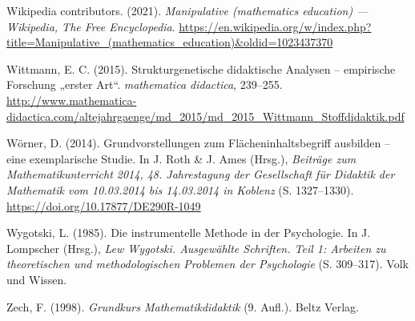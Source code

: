 \documentclass[
]{scrbook}
\newlength{\cslhangindent}
\newlength{\cslentryspacingunit} %
\newenvironment{CSLReferences}[2] %
 {%
  \setlength{\parindent}{0pt}
  \ifodd #1
  \let\oldpar\par
  \def\par{\hangindent=\cslhangindent\oldpar}
  \fi
  \setlength{\parskip}{#2\cslentryspacingunit}
 }%
 {}
\theoremstyle{definition}
\theoremstyle{definition}
\theoremstyle{definition}
\theoremstyle{definition}
\theoremstyle{remark}
\begin{document}
\begin{CSLReferences}{1}{0}
\leavevmode{}%
Wikipedia contributors. (2021). \emph{Manipulative (mathematics education) --- {Wikipedia}{,} The Free Encyclopedia}. \url{https://en.wikipedia.org/w/index.php?title=Manipulative_(mathematics_education)\&oldid=1023437370}

\leavevmode{}%
Wittmann, E. C. (2015). Strukturgenetische didaktische {Analysen} -- empirische {Forschung} „erster {Art}``. \emph{mathematica didactica}, 239--255. \url{http://www.mathematica-didactica.com/altejahrgaenge/md_2015/md_2015_Wittmann_Stoffdidaktik.pdf}

\leavevmode{}%
Wörner, D. (2014). Grundvorstellungen zum {Flächeninhaltsbegriff} ausbilden -- eine exemplarische {Studie}. In J. Roth \& J. Ames (Hrsg.), \emph{Beiträge zum {Mathematikunterricht} 2014, 48. {Jahrestagung} der {Gesellschaft} für {Didaktik} der {Mathematik} vom 10.03.2014 bis 14.03.2014 in {Koblenz}} (S. 1327--1330). \url{https://doi.org/10.17877/DE290R-1049}

\leavevmode{}%
Wygotski, L. (1985). Die instrumentelle {Methode} in der {Psychologie}. In J. Lompscher (Hrsg.), \emph{Lew {Wygotski}. {Ausgewählte} {Schriften}. {Teil} 1: {Arbeiten} zu theoretischen und methodologischen {Problemen} der {Psychologie}} (S. 309--317). Volk und Wissen.

\leavevmode{}%
Zech, F. (1998). \emph{Grundkurs {Mathematikdidaktik}} (9. Aufl.). Beltz Verlag.

\end{CSLReferences}

\printindex
\end{document}
